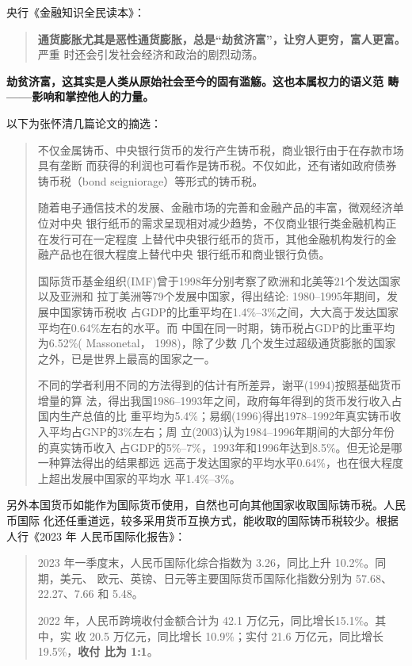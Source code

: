 央行《金融知识全民读本》：
\begin{quotation}
  \textbf{通货膨胀尤其是恶性通货膨胀，总是“劫贫济富”，让穷人更穷，富人更富。}严重
  时还会引发社会经济和政治的剧烈动荡。
\end{quotation}

\textbf{劫贫济富，这其实是人类从原始社会至今的固有滥觞。这也本属权力的语义范
  畴——影响和掌控他人的力量。}

以下为张怀清几篇论文的摘选：
\begin{quotation}
  不仅金属铸币、中央银行货币的发行产生铸币税，商业银行由于在存款市场具有垄断
  而获得的利润也可看作是铸币税。不仅如此，还有诸如政府债券铸币税（bond
  seigniorage）等形式的铸币税。

  随着电子通信技术的发展、金融市场的完善和金融产品的丰富，微观经济单位对中央
  银行纸币的需求呈现相对减少趋势，不仅商业银行类金融机构正在发行可在一定程度
  上替代中央银行纸币的货币，其他金融机构发行的金融产品也在很大程度上替代中央
  银行纸币和商业银行负债。

  国际货币基金组织(IMF)曾于1998年分别考察了欧洲和北美等21个发达国家以及亚洲和
  拉丁美洲等79个发展中国家，得出结论: 1980–1995年期间，发展中国家铸币税收
  占GDP的比重平均在1.4\%–3\%之间，大大高于发达国家平均在0.64\%左右的水平。而
  中国在同一时期，铸币税占GDP的比重平均为6.52\%( Massonetal， 1998)，除了少数
  几个发生过超级通货膨胀的国家之外，已是世界上最高的国家之一。

  不同的学者利用不同的方法得到的估计有所差异，谢平(1994)按照基础货币增量的算
  法，得出我国1986--1993年之间，政府每年得到的货币发行收入占国内生产总值的比
  重平均为5.4\%；易纲(1996)得出1978--1992年真实铸币收入平均占GNP的3\%左右；周
  立(2003)认为1984--1996年期间的大部分年份的真实铸币收入
  占GDP的5\%--7\%，1993年和1996年达到8.5\%。但无论是哪一种算法得出的结果都远
  远高于发达国家的平均水平0.64\%，也在很大程度上超出发展中国家的平均水
  平1.4\%--3\%。
\end{quotation}

另外本国货币如能作为国际货币使用，自然也可向其他国家收取国际铸币税。人民币国际
化还任重道远，较多采用货币互换方式，能收取的国际铸币税较少。根据人行《2023 年
人民币国际化报告》：
\begin{quotation}
  2023 年一季度末，人民币国际化综合指数为 3.26，同比上升 10.2\%。同期，美元、
  欧元、英镑、日元等主要国际货币国际化指数分别为 57.68、22.27、7.66 和 5.48。

  2022 年，人民币跨境收付金额合计为 42.1 万亿元，同比增长15.1\%。其中，实
  收 20.5 万亿元，同比增长 10.9\%；实付 21.6 万亿元，同比增长 19.5\%，\textbf{收付
    比为 1:1}。
\end{quotation}

